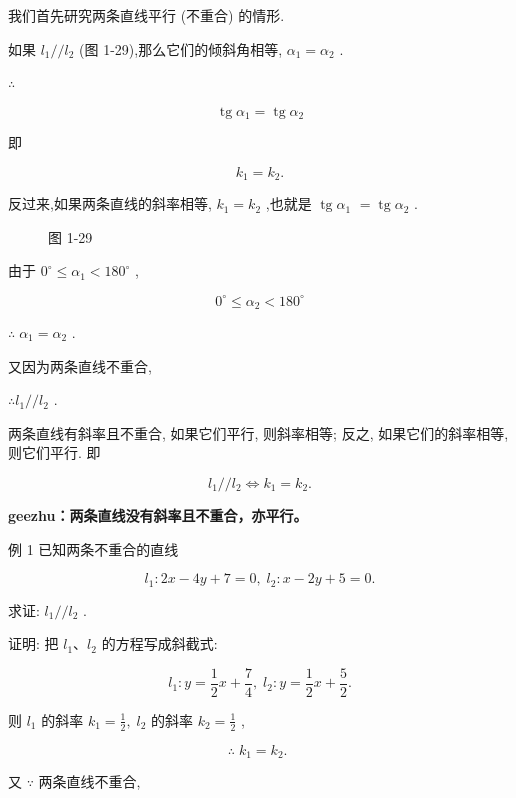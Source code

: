 \documentclass[lang=cn,newtx,12pt,scheme=chinese]{elegantbook}
\begin{document}
我们首先研究两条直线平行 (不重合) 的情形.

如果 \({l}_{1}//{l}_{2}\) (图 1-29),那么它们的倾斜角相等, \({\alpha }_{1} = {\alpha }_{2}\) .

\(\therefore\)

\[
  \operatorname{tg}{\alpha }_{1} = \operatorname{tg}{\alpha }_{2}
\]

即

\[
    {k}_{1} = {k}_{2}\text{.}
\]

反过来,如果两条直线的斜率相等, \({k}_{1} = {k}_{2}\) ,也就是 \(\operatorname{tg}{\alpha }_{1}\) \(= \operatorname{tg}{\alpha }_{2}\) .

\begin{figure}[h]
  \centering
  
  \caption{图 1-29}
\end{figure}

由于 \({0}^{ \circ } \leq {\alpha }_{1} < {180}^{ \circ }\) ,

\[
    {0}^{ \circ } \leq {\alpha }_{2} < {180}^{ \circ }
\]

\(\therefore \;{\alpha }_{1} = {\alpha }_{2}\) .

又因为两条直线不重合,

\(\therefore {l}_{1}//{l}_{2}\) .
\begin{corollary}
两条直线有斜率且不重合, 如果它们平行, 则斜率相等; 反之, 如果它们的斜率相等, 则它们平行. 即

\[
    {l}_{1}//{l}_{2} \Leftrightarrow {k}_{1} = {k}_{2}\text{.}
\]

\end{corollary}

\textbf{geezhu：两条直线没有斜率且不重合，亦平行。}

例 1 已知两条不重合的直线

\[
    {l}_{1} : {2x} - {4y} + 7 = 0,\;{l}_{2} : x - {2y} + 5 = 0.
\]

求证: \({l}_{1}//{l}_{2}\) .

证明: 把 \({l}_{1}\text{、}{l}_{2}\) 的方程写成斜截式:

\[
    {l}_{1} : y = \frac{1}{2}x + \frac{7}{4},\;{l}_{2} : y = \frac{1}{2}x + \frac{5}{2}.
\]

则 \({l}_{1}\) 的斜率 \({k}_{1} = \frac{1}{2},\;{l}_{2}\) 的斜率 \({k}_{2} = \frac{1}{2}\) ,

\[
  \therefore \;{k}_{1} = {k}_{2}\text{. }
\]

又 \(\because\) 两条直线不重合,
\end{document}
